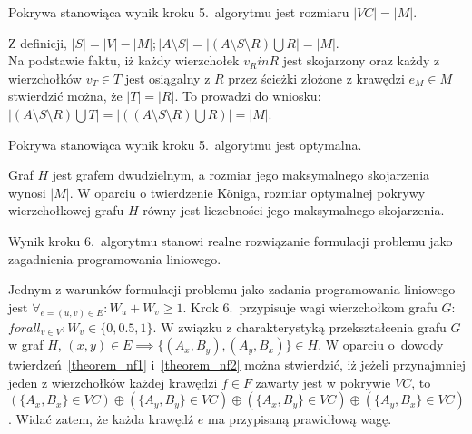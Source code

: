 \begin{theorem}
  Pokrywa stanowiąca wynik kroku 5.\ algorytmu jest rozmiaru $|VC| = |M|$. 
\end{theorem}
\begin{bproof}
  Z definicji, $|S| = |V| - |M|; |A \setminus S|=|(A \setminus S
  \setminus R) \bigcup R|=|M|$.\\
  Na podstawie faktu, iż każdy wierzchołek $v_R in R$ jest skojarzony oraz
  każdy z wierzchołków $v_T \in T$ jest osiągalny z $R$ przez ścieżki złożone z
  krawędzi $e_M \in M$ stwierdzić można, że $|T|=|R|$.
  To prowadzi do wniosku: $|(A\setminus S\setminus R)\bigcup T|=|((A \setminus
  S \setminus R) \bigcup R)|=|M|$.
\end{bproof}
\begin{theorem}\label{theorem_nf2}
  Pokrywa stanowiąca wynik kroku 5.\ algorytmu jest optymalna.
\end{theorem}
\begin{bproof}
  Graf $H$ jest grafem dwudzielnym, a rozmiar jego maksymalnego skojarzenia
  wynosi $|M|$.
  W oparciu o twierdzenie K\"oniga, rozmiar optymalnej pokrywy wierzchołkowej
  grafu $H$ równy jest liczebności jego maksymalnego skojarzenia.
\end{bproof}
\begin{theorem}
  Wynik kroku 6.~algorytmu stanowi realne rozwiązanie formulacji problemu jako
  zagadnienia programowania liniowego.
\end{theorem}
\begin{bproof}
  Jednym z warunków formulacji problemu jako zadania programowania liniowego jest
  $\forall_{e=(u,v) \in E}: W_u + W_v \geq 1$.
  Krok 6.\ przypisuje wagi wierzchołkom grafu $G$: ${forall_{v \in V}: W_v \in
  \{0, 0.5, 1\}}$.
  W związku z charakterystyką przekształcenia grafu $G$ w graf $H$, 
  $(x,y) \in E \implies \{(A_x, B_y), (A_y, B_x)\} \in H$.
  W oparciu o~dowody twierdzeń~\ref{theorem_nf1} i~\ref{theorem_nf2} można
  stwierdzić, iż jeżeli przynajmniej jeden z wierzchołków każdej krawędzi $f \in
  F$ zawarty jest w pokrywie $VC$, to $(\{A_x, B_x\} \in VC) \oplus (\{A_y,
  B_y\} \in VC) \oplus (\{A_x, B_y\} \in VC) \oplus (\{A_y, B_x\} \in VC)$.
  Widać zatem, że każda krawędź $e$ ma przypisaną prawidłową wagę.
\end{bproof}
